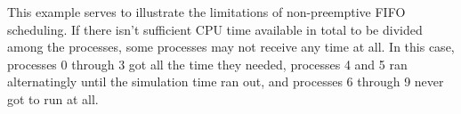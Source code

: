 \documentclass{article}
\begin{document}
	This example serves to illustrate the limitations of non-preemptive FIFO
	scheduling. If there isn't sufficient CPU time available in total to be
	divided among the processes, some processes may not receive any time at all.
	In this case, processes 0 through 3 got all the time they needed,
	processes 4 and 5 ran alternatingly until the simulation time ran out, and
	processes 6 through 9 never got to run at all.
    
\end{document}
